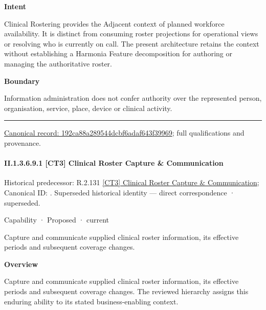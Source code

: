 \textbf{Intent}



Clinical Rostering provides the Adjacent context of planned workforce availability. It is distinct from consuming roster projections for operational views or resolving who is currently on call. The present architecture retains the context without establishing a Harmonia Feature decomposition for authoring or managing the authoritative roster.



\textbf{Boundary}



Information administration does not confer authority over the represented person, organisation, service, place, device or clinical activity.



\medskip\hrule\medskip

{\footnotesize \href{../../../../../../../continuum/strategy/capability/192ca88a289544dcbf6adaf643f39969.md}{Canonical record: 192ca88a289544dcbf6adaf643f39969}; full qualifications and provenance.}\par
\paragraph*{II.1.3.6.9.1 [CT3] Clinical Roster Capture \& Communication}
\label{navigation:II.1.3.6.9.1}

{\small Historical predecessor: R.2.131 \hyperref[element:2054d57bb33a4361b3ef0824545a1784]{[CT3] Clinical Roster Capture \& Communication}; Canonical ID: \texttt{}. Superseded historical identity — direct correspondence · superseded.}\par
\label{element:8243cba81fb6449781d10823ae194237}
{\small Capability · Proposed · current}\par

Capture and communicate supplied clinical roster information, its effective periods and subsequent coverage changes.



\textbf{Overview}



Capture and communicate supplied clinical roster information, its effective periods and subsequent coverage changes. The reviewed hierarchy assigns this enduring ability to its stated business-enabling context.




